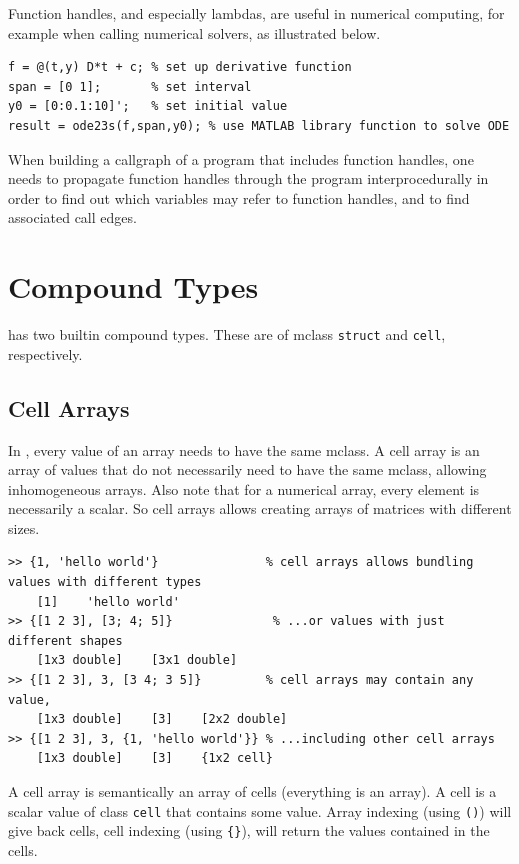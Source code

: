 Function handles, and especially lambdas, are
useful in numerical computing, for example when calling numerical
solvers, as illustrated below.

\begin{lstlisting}
f = @(t,y) D*t + c; % set up derivative function
span = [0 1];       % set interval
y0 = [0:0.1:10]';   % set initial value
result = ode23s(f,span,y0); % use MATLAB library function to solve ODE
\end{lstlisting}

When building a callgraph of a program that includes function handles,
one needs to propagate function handles through the program
interprocedurally in order to find out which variables may refer to
function handles, and to find associated call edges.


\section{Compound Types}

\matlab has two builtin compound types. These are of mclass \lstinline{struct} and
\lstinline{cell}, respectively.

\subsection{Cell Arrays}
\label{sec:cell}

In \matlab, every value of an array needs to have the same mclass. A
cell array is an array of values that do not necessarily need to have
the same mclass, allowing inhomogeneous arrays. Also note that for a numerical array,
every element is necessarily a scalar. So cell arrays allows creating arrays
of matrices with different sizes.

\begin{lstlisting}
>> {1, 'hello world'}               % cell arrays allows bundling values with different types
    [1]    'hello world'
>> {[1 2 3], [3; 4; 5]}              % ...or values with just different shapes
    [1x3 double]    [3x1 double]    
>> {[1 2 3], 3, [3 4; 3 5]}         % cell arrays may contain any value,
    [1x3 double]    [3]    [2x2 double] 
>> {[1 2 3], 3, {1, 'hello world'}} % ...including other cell arrays
    [1x3 double]    [3]    {1x2 cell}
\end{lstlisting}

A cell array is semantically an array of cells (everything is an
array). A cell is a scalar value of class \lstinline{cell} that
contains some \matlab value. Array indexing (using
{\tt ()}) will give back cells, cell indexing (using {\tt \{\}}),
will return the values contained in the cells.

